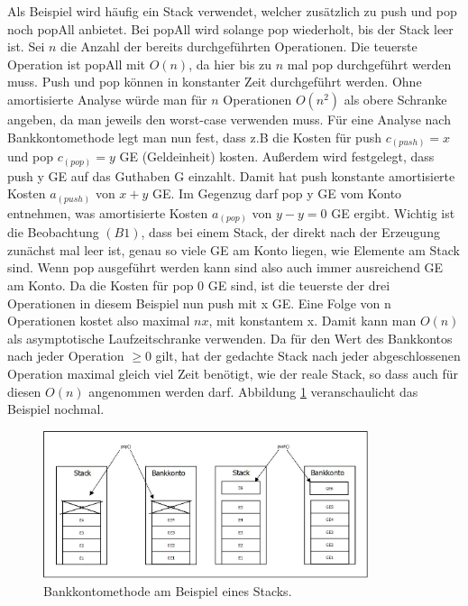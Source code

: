 \documentclass[11pt, a4paper]{article}
\begin{document}
\noindent Als Beispiel wird häufig ein Stack verwendet, welcher zusätzlich zu push und pop noch popAll anbietet. Bei popAll wird solange pop wiederholt, bis der Stack leer ist. Sei $n$ die Anzahl der bereits durchgeführten Operationen. Die teuerste Operation ist popAll mit $O(n)$, da hier bis zu $n$ mal pop durchgeführt werden muss. Push und pop können in konstanter Zeit durchgeführt werden. Ohne amortisierte Analyse würde man für $n$ Operationen $O(n^2)$ als obere Schranke angeben, da man jeweils den worst-case verwenden muss.
\noindent Für eine Analyse nach Bankkontomethode legt man nun fest, dass z.B die Kosten für push $c_(push) = x$ und pop $c_(pop) = y$  GE (Geldeinheit) kosten. Außerdem wird festgelegt, dass push y GE auf das Guthaben G einzahlt. Damit hat push konstante amortisierte Kosten  $a_(push)$ von $x + y$ GE. Im Gegenzug darf pop y GE vom Konto entnehmen, was amortisierte Kosten $a_(pop)$ von $y - y = 0$ GE ergibt. Wichtig ist die Beobachtung $(B1)$, dass bei einem Stack, der direkt nach der Erzeugung zunächst mal leer ist, genau so viele GE am Konto liegen, wie Elemente am Stack sind. Wenn pop ausgeführt werden kann sind also auch immer ausreichend GE am Konto. Da die Kosten für pop 0 GE sind, ist die teuerste der drei Operationen in diesem Beispiel nun push mit x GE. Eine Folge von n Operationen kostet also maximal $nx$, mit konstantem x. Damit kann man  $O(n)$ als asymptotische Laufzeitschranke verwenden. Da für den Wert des Bankkontos nach jeder Operation  $\geq 0$ gilt, hat der gedachte Stack nach jeder abgeschlossenen Operation maximal gleich viel Zeit benötigt, wie der reale Stack, so dass auch für diesen   $O(n)$ angenommen werden darf.  Abbildung \ref{fig:bankkontomethode} veranschaulicht das Beispiel nochmal.     
\begin{figure}[h]
	\centering
	\includegraphics[width=0.85\textwidth]{"bilder/bankkontomethode"}
	\caption{Bankkontomethode am Beispiel eines Stacks. }
	\label{fig:bankkontomethode}
\end{figure}  
\end{document}
